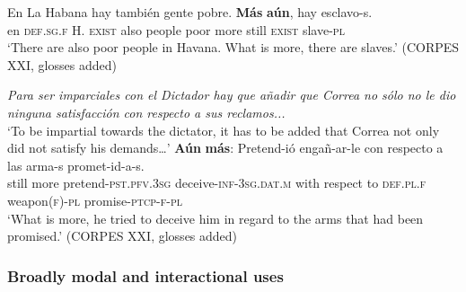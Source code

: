 \begin{exe}
	\ex \gll En La Habana hay también gente pobre. \textbf{Más} \textbf{aún}, hay esclavo-s.\\
	en \textsc{def}.\textsc{sg}.\textsc{f} H. \textsc{exist} also people poor more still \textsc{exist} slave-\textsc{pl}\\
\glt \lq There are also poor people in Havana. What is more, there are slaves.' (CORPES XXI, glosses added)
	
	\ex \textit{Para ser imparciales con el Dictador hay que añadir que Correa no sólo no le dio ninguna satisfacción con respecto a sus reclamos...}\\
	\lq To be impartial towards the dictator, it has to be added that Correa not only did not satisfy his demands…'
	\exi{}\gll \textbf{Aún} \textbf{más}: Pretend-ió engañ-ar-le con respecto a las arma-s promet-id-a-s.\\
	still more pretend-\textsc{pst}.\textsc{pfv}.3\textsc{sg} deceive-\textsc{inf}-3\textsc{sg}.\textsc{dat}.\textsc{m} with respect to \textsc{def}.\textsc{pl}.\textsc{f} weapon(\textsc{f})-\textsc{pl} promise-\textsc{ptcp}-\textsc{f}-\textsc{pl}\\
	\glt \lq What is more, he tried to deceive him in regard to the arms that had been promised.' (CORPES XXI, glosses added)
\end{exe}

\subsubsection{Broadly modal and interactional uses}
